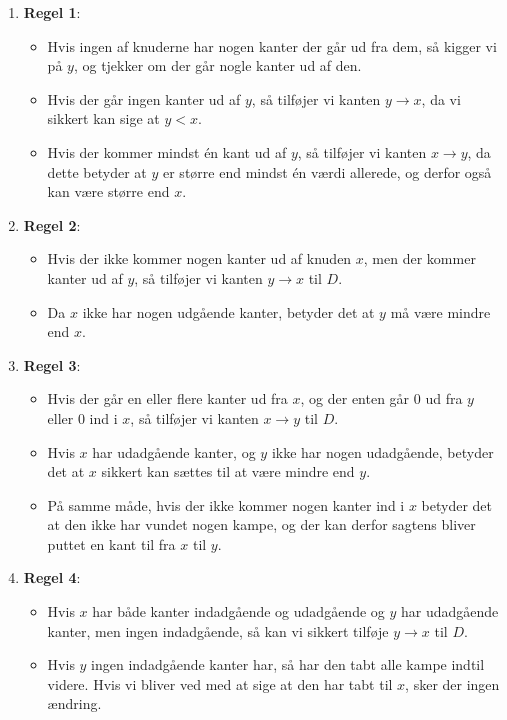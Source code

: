 \begin{enumerate}
	\item \textbf{Regel 1}:
	      \begin{itemize}
		      \item Hvis ingen af knuderne har nogen kanter der går ud fra dem, så kigger vi på $y$, og tjekker om der går nogle kanter ud af den.
		      \item Hvis der går ingen kanter ud af $y$, så tilføjer vi kanten $y \rightarrow x$, da vi sikkert kan sige at $y < x$.
		      \item Hvis der kommer mindst én kant ud af $y$, så tilføjer vi kanten $x \rightarrow y$, da dette betyder at $y$ er større end mindst én værdi allerede, og derfor også kan være større end $x$.
	      \end{itemize}
	\item \textbf{Regel 2}:
	      \begin{itemize}
		      \item Hvis der ikke kommer nogen kanter ud af knuden $x$, men der kommer kanter ud af $y$, så tilføjer vi kanten $y \rightarrow x$ til $D$.
		      \item Da $x$ ikke har nogen udgående kanter, betyder det at $y$ må være mindre end $x$.
	      \end{itemize}
	\item \textbf{Regel 3}:
	      \begin{itemize}
		      \item Hvis der går en eller flere kanter ud fra $x$, og der enten går 0 ud fra $y$ eller 0 ind i $x$, så tilføjer vi kanten $x \rightarrow y$ til $D$.
		      \item Hvis $x$ har udadgående kanter, og $y$ ikke har nogen udadgående, betyder det at $x$ sikkert kan sættes til at være mindre end $y$.
		      \item  På samme måde, hvis der ikke kommer nogen kanter ind i $x$ betyder det at den ikke har vundet nogen kampe, og der kan derfor sagtens bliver puttet en kant til fra $x$ til $y$.
	      \end{itemize}
	\item \textbf{Regel 4}:
	      \begin{itemize}
		      \item Hvis $x$ har både kanter indadgående og udadgående og $y$ har udadgående kanter, men ingen indadgående, så kan vi sikkert tilføje $y \rightarrow x$ til $D$.
		      \item Hvis $y$ ingen indadgående kanter har, så har den tabt alle kampe indtil videre. Hvis vi bliver ved med at sige at den har tabt til $x$, sker der ingen ændring.

\end{itemize}
\end{enumerate}
